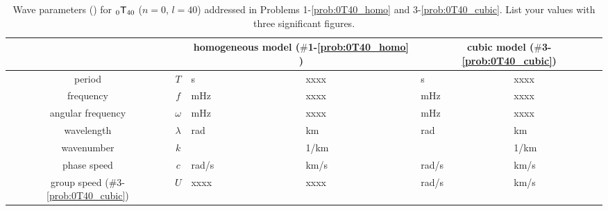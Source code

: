 \documentclass[11pt,titlepage,fleqn]{article}
\newcommand{\tnl}[2]{\mbox{$_{#1}\ssT_{#2}$}}
\newcommand{\blank}{xxxx}
\begin{document}
\begin{table}
\caption[]
{{
Wave parameters () for \tnl{0}{40} ($n=0$, $l=40$) addressed in Problems 1-\ref{prob:0T40_homo} and 3-\ref{prob:0T40_cubic}. List your values with three significant figures.
\label{tab:eigfun}
}}
\begin{spacing}{1.5}
\hspace{-1.0cm}
\begin{tabular}{||c|c|l|l||l|l||}
\hline
& & \multicolumn{2}{c||}{homogeneous model ($\#$1-\ref{prob:0T40_homo} )} & \multicolumn{2}{c||}{cubic model ($\#$3-\ref{prob:0T40_cubic})}  \\ \hline\hline
period & $T$ & \hspace{2cm}s & \blank & \hspace{2cm}s & \blank \\  \hline
frequency & $f$ & \hspace{2cm}mHz & \blank & \hspace{2cm}mHz & \blank \\  \hline
angular frequency & $\omega$ & \hspace{2cm}mHz & \blank  & \hspace{2cm}mHz & \blank \\  \hline
wavelength & $\lambda$ & \hspace{2cm}rad & \hspace{2cm}km & \hspace{2cm}rad & \hspace{2cm}km \\  \hline
wavenumber & $k$ & \hspace{2cm} & \hspace{2cm}1/km & \hspace{2cm} & \hspace{2cm}1/km \\  \hline
phase speed & $c$ & \hspace{2cm}rad/s & \hspace{2cm}km/s & \hspace{2cm}rad/s & \hspace{2cm}km/s \\  \hline\hline
group speed ($\#$3-\ref{prob:0T40_cubic}) & $U$ & \blank & \blank & \hspace{2cm}rad/s & \hspace{2cm}km/s \\  \hline
\hline
\end{tabular}
\end{spacing}
\end{table}
\end{document}
